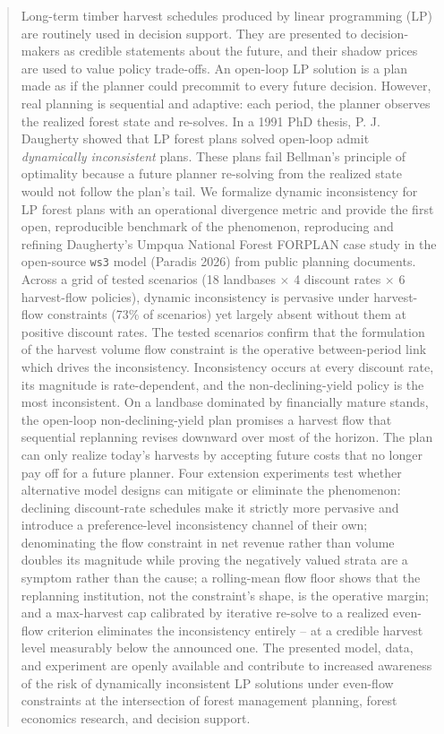 \begin{abstract}
Long-term timber harvest schedules produced by linear programming (LP) are routinely used in decision support. They are presented to decision-makers as credible statements about the future, and their shadow prices are used to value policy trade-offs. An open-loop LP solution is a plan made as if the planner could precommit to every future decision. However, real planning is sequential and adaptive: each period, the planner observes the realized forest state and re-solves. In a 1991 PhD thesis, P. J. Daugherty showed that LP forest plans solved open-loop admit \emph{dynamically inconsistent} plans. These plans fail Bellman's principle of optimality because a future planner re-solving from the realized state would not follow the plan's tail. We formalize dynamic inconsistency for LP forest plans with an operational divergence metric and provide the first open, reproducible benchmark of the phenomenon, reproducing and refining Daugherty's Umpqua National Forest FORPLAN case study in the open-source \texttt{ws3} model (Paradis 2026) from public planning documents. Across a grid of tested scenarios (18 landbases $\times$ 4 discount rates $\times$ 6 harvest-flow policies), dynamic inconsistency is pervasive under harvest-flow constraints (73\% of scenarios) yet largely absent without them at positive discount rates. The tested scenarios confirm that the formulation of the harvest volume flow constraint is the operative between-period link which drives the inconsistency. Inconsistency occurs at every discount rate, its magnitude is rate-dependent, and the non-declining-yield policy is the most inconsistent. On a landbase dominated by financially mature stands, the open-loop non-declining-yield plan promises a harvest flow that sequential replanning revises downward over most of the horizon. The plan can only realize today's harvests by accepting future costs that no longer pay off for a future planner. Four extension experiments test whether alternative model designs can mitigate or eliminate the phenomenon: declining discount-rate schedules make it strictly more pervasive and introduce a preference-level inconsistency channel of their own; denominating the flow constraint in net revenue rather than volume doubles its magnitude while proving the negatively valued strata are a symptom rather than the cause; a rolling-mean flow floor shows that the replanning institution, not the constraint's shape, is the operative margin; and a max-harvest cap calibrated by iterative re-solve to a realized even-flow criterion eliminates the inconsistency entirely -- at a credible harvest level measurably below the announced one. The presented model, data, and experiment are openly available and contribute to increased awareness of the risk of dynamically inconsistent LP solutions under even-flow constraints at the intersection of forest management planning, forest economics research, and decision support.
\end{abstract}